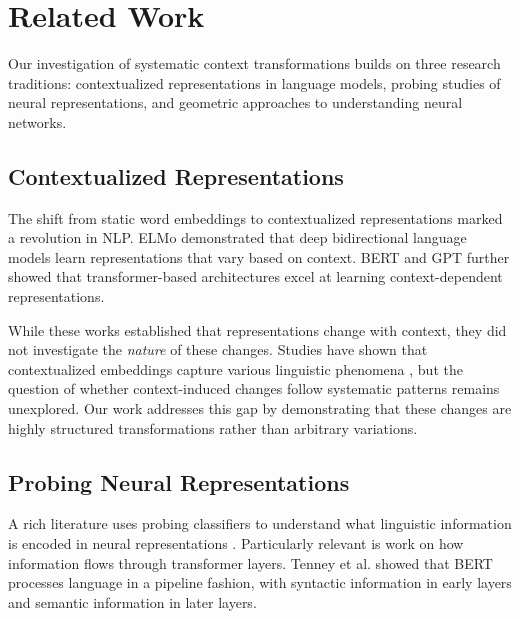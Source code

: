 
\section{Related Work}

Our investigation of systematic context transformations builds on three research traditions: contextualized representations in language models, probing studies of neural representations, and geometric approaches to understanding neural networks.

\subsection{Contextualized Representations}

The shift from static word embeddings \cite{mikolov2013word2vec, pennington2014glove} to contextualized representations marked a revolution in NLP. ELMo \cite{peters2018elmo} demonstrated that deep bidirectional language models learn representations that vary based on context. BERT \cite{devlin2019bert} and GPT \cite{radford2018gpt, radford2019gpt2} further showed that transformer-based architectures excel at learning context-dependent representations.

While these works established that representations change with context, they did not investigate the \emph{nature} of these changes. Studies have shown that contextualized embeddings capture various linguistic phenomena \cite{tenney2019bert, rogers2020primer}, but the question of whether context-induced changes follow systematic patterns remains unexplored. Our work addresses this gap by demonstrating that these changes are highly structured transformations rather than arbitrary variations.

\subsection{Probing Neural Representations}

A rich literature uses probing classifiers to understand what linguistic information is encoded in neural representations \cite{conneau2018probing, hewitt2019structural}. Particularly relevant is work on how information flows through transformer layers. Tenney et al. \cite{tenney2019bert} showed that BERT processes language in a pipeline fashion, with syntactic information in early layers and semantic information in later layers.

